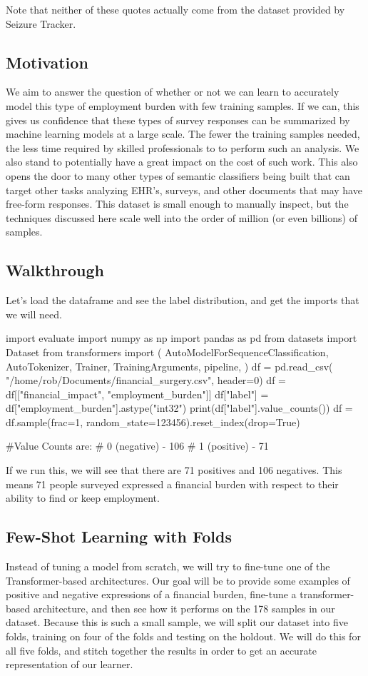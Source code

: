 Note that neither of these quotes actually come from the dataset provided by Seizure Tracker.

\subsection{Motivation}
We aim to answer the question of whether or not we can learn to accurately model this type of employment burden with few training samples. If we can, this gives us confidence that these types of survey responses
can be summarized by machine learning models at a large scale. The fewer the training samples needed, the less time required by skilled professionals to to perform such an analysis. We also stand to potentially have a great impact on the cost of such work.
This also opens the door to many other types of semantic classifiers being built that can target other tasks analyzing EHR's, surveys, and other documents that may have free-form responses.
This dataset is small enough to manually inspect, but the techniques discussed here scale well into the order of million (or even billions) of samples.


\subsection{Walkthrough}

Let's load the dataframe and see the label distribution, and get the imports that we will need.

\begin{python}

import evaluate
import numpy as np
import pandas as pd
from datasets import Dataset
from transformers import (
    AutoModelForSequenceClassification,
    AutoTokenizer,
    Trainer,
    TrainingArguments,
    pipeline,
)
df = pd.read_csv(
    "/home/rob/Documents/financial_surgery.csv",
    header=0)
df = df[["financial_impact", "employment_burden"]]
df["label"] = df["employment_burden"].astype("int32")
print(df["label"].value_counts())
df = df.sample(frac=1,
    random_state=123456).reset_index(drop=True)

#Value Counts are:
# 0 (negative) - 106
# 1 (positive) - 71
\end{python}

If we run this, we will see that there are 71 positives and 106 negatives. This means 71 people surveyed expressed a financial burden
with respect to their ability to find or keep employment.

\subsection{Few-Shot Learning with Folds}
Instead of tuning a model from scratch, we will try to fine-tune one of the Transformer-based architectures. Our goal will be to provide some examples of positive and negative expressions of a financial burden, fine-tune a transformer-based
architecture, and then see how it performs on the 178 samples in our dataset. Because this is such a small sample, we will split our dataset into five folds, training on four of the folds and testing on the holdout. We will do this for all
five folds, and stitch together the results in order to get an accurate representation of our learner.

